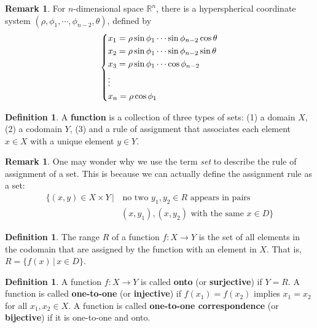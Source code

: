 \documentclass[t]{beamer}
\theoremstyle{plain}
\theoremstyle{definition}
\newtheorem{defn}[thm]{Definition}
\newtheorem{rem}[thm]{Remark}
\begin{document}
\begin{frame}
\begin{rem}
	For $n$-dimensional space $\mathbb R^n$,
	there is a hyperspherical coordinate system
	$(\rho,\phi_1,\cdots,\phi_{n-2},\theta)$, defined by
	$$\begin{dcases}
	x_1 = \rho\sin\phi_1\cdots
		\sin\phi_{n-2}\cos\theta \\
	x_2 = \rho\sin\phi_1\cdots
		\sin\phi_{n-2}\sin\theta \\
	x_3 = \rho\sin\phi_1\cdots\cos\phi_{n-2} \\
	\vdots\\
	x_n = \rho\cos\phi_1 \end{dcases}$$
\end{rem}
\end{frame}

\begin{frame}
\begin{defn}
A \textbf{function} is a collection of three types of sets: (1) a domain $X$, (2) a codomain $Y$, (3) and a rule of assignment that associates each element $x\in X$ with a unique element $y\in Y$. 
\end{defn}
\begin{rem}
One may wonder why we use the term \emph{set} to describe the rule of assignment of a set. This is because we can actually define the assignment rule as a set:
	\begin{align*}
	\{(x,y)\in X\times Y\,|&\, \textrm{no two }y_1,y_2\in R\textrm{ appears in pairs} \\
	 &(x,y_1), (x,y_2)\textrm{ with the same }x\in D\}
	 \end{align*}
\end{rem}
\end{frame}

\begin{frame}
\begin{defn}
The \textrm{range} $R$ of a function $f:X\to Y$ is the set of all elements in the codomain that are assigned by the function with an element in $X$. That is, $R = \{f(x)\,|\,x\in D\}$.
\end{defn}
\begin{defn}
A function $f:X\to Y$ is called \textbf{onto} (or \textbf{surjective}) if $Y=R$. A function is called \textbf{one-to-one} (or \textbf{injective}) if $f(x_1)=f(x_2)$ implies $x_1=x_2$ for all $x_1,x_2\in X$. A function is called \textbf{one-to-one correspondence} (or \textbf{bijective}) if it is one-to-one and onto.
\end{defn}
\end{frame}
\end{document}
